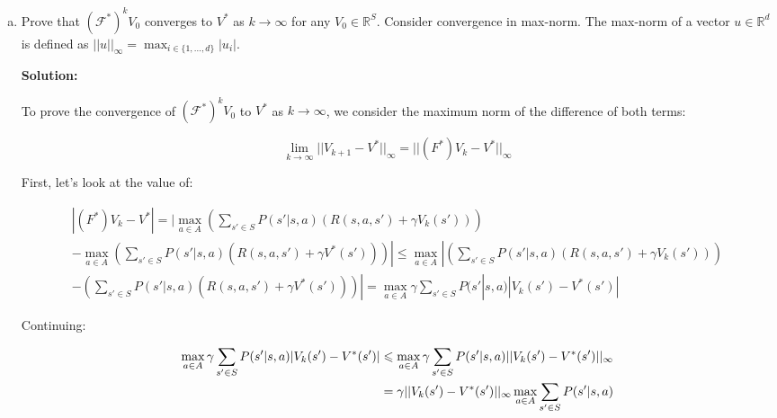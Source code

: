\documentclass[12pt]{article}
\begin{document}
\begin{enumerate}[a)]
  \item Prove that $(\mathcal F ^*) ^ k V _0$ converges to $V ^*$ as $k \to \infty$
    for any $V _0 \in \mathbb R ^ S$. 
    Consider convergence in max-norm. The max-norm of a vector 
    $u \in \mathbb R ^d $ is defined as  
    ${ || u || } _\infty = \max _{i \in \{1, \ldots, d \} }{ | u _i | }$. 

    \textbf{Solution:}

    To prove the convergence of $(\mathcal F ^*) ^ k V _0$ to $V^*$ as $k \to \infty$, we consider the maximum norm of the difference of both terms:

    \begin{equation}
      \lim_{k \to \infty} ||V_{k+1}-V^*||_{\infty} = ||(F^*)V_{k}-V^*||_{\infty}
    \end{equation}
    
    First, let's look at the value of:

    \begin{equation}
    \begin{split}
      |(F^*)V_k-V^*|=
      |\max _{a \in A} 
      \left(
        \sum _{s' \in S} 
          P(s' | s, a) \left(
            R (s, a, s') + \gamma V_k ( s' )
          \right)
      \right) \\ - 
      \max _{a \in A} 
      \left(
        \sum _{s' \in S} 
          P(s' | s, a) \left(
            R (s, a, s') + \gamma V^* ( s' )
          \right)
      \right)|
      \leqslant
      \max _{a \in A}| 
      \left(
        \sum _{s' \in S} 
          P(s' | s, a) \left(
            R (s, a, s') + \gamma V_k ( s' )
          \right)
      \right) \\ -  
      \left(
        \sum _{s' \in S} 
          P(s' | s, a) \left(
            R (s, a, s') + \gamma V^* ( s' )
          \right)
      \right)|
      =
      \max _{a \in A}
      \gamma
        \sum _{s' \in S} 
          P(s' | s, a) |
            V_k (s')- V^* ( s') |
      \end{split}
    \end{equation}

Continuing: 

\begin{equation}
 \begin{split}
        \max _{a \in A}
      \gamma
        \sum _{s' \in S} 
          P(s' | s, a) |
            V_k (s')- V^* ( s') |
      \leqslant
  \max _{a \in A}
      \gamma
        \sum _{s' \in S} 
          P(s' | s, a) ||
            V_k (s')- V^* ( s') ||_{\infty}
    \newline \\
    =\gamma ||V_k (s')- V^* ( s') ||_{\infty} \max _{a \in A}\sum _{s' \in S} P(s' | s, a)
            \end{split}
\end{equation}


\end{enumerate}
\end{document}

